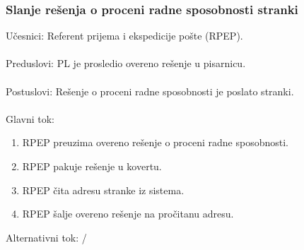 \subsubsection{Slanje rešenja o proceni radne sposobnosti stranki}
\label{su: slanje resenja o radnoj sposobnosti}

\noindent Učesnici: Referent prijema i ekspedicije pošte (RPEP).
\\
\\ Preduslovi: PL je prosledio overeno re\v senje u pisarnicu.
\\
\\ Postuslovi: Rešenje o proceni radne sposobnosti je poslato stranki.
\\
\\ Glavni tok:
\begin{enumerate}
	\item RPEP preuzima overeno rešenje o proceni radne sposobnosti.
	\item RPEP pakuje rešenje u kovertu.
	\item RPEP čita adresu stranke iz sistema.
	\item RPEP šalje overeno rešenje na pročitanu adresu.
\end{enumerate}


\noindent Alternativni tok: /

